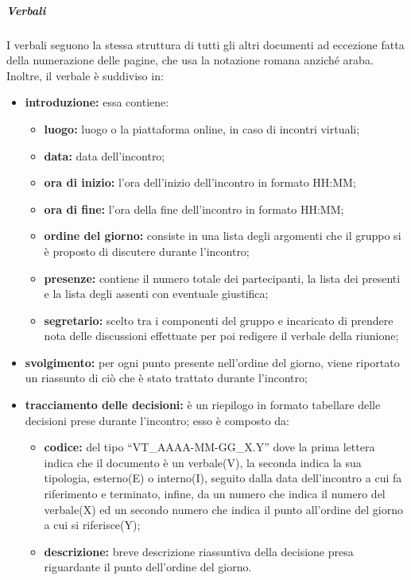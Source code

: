 				\subparagraph{Verbali}
					  I verbali seguono la stessa struttura di tutti gli altri documenti ad eccezione fatta della numerazione delle pagine, che usa la notazione romana anziché araba. Inoltre, il verbale è suddiviso in:
					\begin{itemize}
						\item \textbf{introduzione:} essa contiene:
							\begin{itemize}
								\item \textbf{luogo:} luogo o la piattaforma online, in caso di incontri virtuali;
								\item \textbf{data:} data dell'incontro;
								\item \textbf{ora di inizio:} l'ora dell'inizio dell'incontro in formato HH:MM;
								\item \textbf{ora di fine:} l'ora della fine dell'incontro in formato HH:MM;
								\item \textbf{ordine del giorno:} consiste in una lista degli argomenti che il gruppo si è proposto di discutere durante l'incontro;
								\item \textbf{presenze:} contiene il numero totale dei partecipanti, la lista dei presenti e la lista degli assenti con eventuale giustifica;
								\item \textbf{segretario: } scelto tra i componenti del gruppo e incaricato di prendere nota delle discussioni effettuate per poi redigere il verbale della riunione;
							\end{itemize}
						\item \textbf{svolgimento:} per ogni punto presente nell'ordine del giorno, viene riportato un riassunto di ciò che è stato trattato durante l'incontro;
						\item \textbf{tracciamento delle decisioni:} è un riepilogo in formato tabellare delle decisioni prese durante l'incontro; esso è composto da:
							\begin{itemize}
								\item \textbf{codice:} del tipo ``VT\_AAAA-MM-GG\_X.Y'' dove la prima lettera indica che il documento è un verbale(V), la seconda indica la sua tipologia, esterno(E) o interno(I), seguito dalla data dell'incontro a cui fa riferimento e terminato, infine, da un numero che indica il numero del verbale(X) ed un secondo numero che indica il punto all'ordine del giorno a cui si riferisce(Y);
								\item \textbf{descrizione:} breve descrizione riassuntiva della decisione presa riguardante il punto dell'ordine del giorno.
							\end{itemize}
					\end{itemize}
